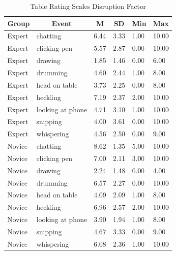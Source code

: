 \documentclass[
  man]{apa6}
\begin{document}
\begin{table}[h]

\begin{center}
\begin{threeparttable}

\caption{\label{tab:rating_scales}Table Rating Scales Disruption Factor}

\tiny{

\begin{tabular}{llllll}
\toprule
Group & \multicolumn{1}{c}{Event} & \multicolumn{1}{c}{M} & \multicolumn{1}{c}{SD} & \multicolumn{1}{c}{Min} & \multicolumn{1}{c}{Max}\\
\midrule
Expert & chatting & 6.44 & 3.33 & 1.00 & 10.00\\
Expert & clicking pen & 5.57 & 2.87 & 0.00 & 10.00\\
Expert & drawing & 1.85 & 1.46 & 0.00 & 6.00\\
Expert & drumming & 4.60 & 2.44 & 1.00 & 8.00\\
Expert & head on table & 3.73 & 2.25 & 0.00 & 8.00\\
Expert & heckling & 7.19 & 2.37 & 2.00 & 10.00\\
Expert & looking at phone & 4.71 & 3.10 & 1.00 & 10.00\\
Expert & snipping & 4.00 & 3.61 & 0.00 & 10.00\\
Expert & whispering & 4.56 & 2.50 & 0.00 & 9.00\\
Novice & chatting & 8.62 & 1.35 & 5.00 & 10.00\\
Novice & clicking pen & 7.00 & 2.11 & 3.00 & 10.00\\
Novice & drawing & 2.24 & 1.48 & 0.00 & 4.00\\
Novice & drumming & 6.57 & 2.27 & 0.00 & 10.00\\
Novice & head on table & 4.09 & 2.09 & 1.00 & 8.00\\
Novice & heckling & 6.96 & 2.57 & 2.00 & 10.00\\
Novice & looking at phone & 3.90 & 1.94 & 1.00 & 8.00\\
Novice & snipping & 4.67 & 3.33 & 0.00 & 9.00\\
Novice & whispering & 6.08 & 2.36 & 1.00 & 10.00\\
\bottomrule
\end{tabular}

}

\end{threeparttable}
\end{center}

\end{table}
\end{document}
